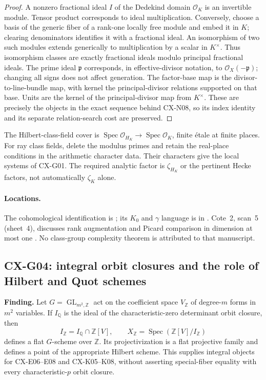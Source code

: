 \documentclass[11pt,a4paper]{article}
\begin{document}
\begin{proof}
A nonzero fractional ideal $I$ of the Dedekind domain $\mathcal O_K$ is an
invertible module.  Tensor product corresponds to ideal multiplication.
Conversely, choose a basis of the generic fiber of a rank-one locally free
module and embed it in $K$; clearing denominators identifies it with a
fractional ideal.  An isomorphism of two such modules extends generically
to multiplication by a scalar in $K^\times$.  Thus isomorphism classes
are exactly fractional ideals modulo principal fractional ideals.
The prime ideal $\mathfrak p$ corresponds, in effective-divisor notation,
to $\mathcal O_X(-\mathfrak p)$; changing all signs does not affect generation.
The factor-base map is the divisor-to-line-bundle map, with kernel the
principal-divisor relations supported on that base.  Units are the kernel
of the principal-divisor map from $K^\times$.  These are precisely the
objects in the exact sequence behind CX-N08, so its index identity and
its separate relation-search cost are preserved.
\end{proof}

The Hilbert-class-field cover is
$\operatorname{Spec}\mathcal O_{H_K}\to\operatorname{Spec}\mathcal O_K$,
finite étale at finite places.  For ray class fields, delete the modulus
primes and retain the real-place conditions in the arithmetic character data.
Their characters give the local systems of CX-G01.  The required analytic
factor is $\zeta_{H_K}$ or the pertinent Hecke factors, not automatically
$\zeta_K$ alone.

\paragraph{Locations.}
The cohomological identification is
\cite[Exp.~IX, Theorem~3.3]{SGA4}; its $K_0$ and $\gamma$ language is in
\cite[Exp.~V 3.10; Exp.~VI 3.2--3.3]{SGA6}.
Cote~2, scan~5 (sheet~4), discusses rank augmentation and Picard comparison
in dimension at most one \cite{Archive2}.  No class-group complexity
theorem is attributed to that manuscript.

\subsection{CX-G04: integral orbit closures and the role of Hilbert and Quot schemes}
\label{finding:CX-G04}

\textbf{Finding.} Let $G=\operatorname{GL}_{m^2,\mathbb Z}$ act on the
coefficient space $V_{\mathbb Z}$ of degree-$m$ forms in $m^2$ variables.
If $I_{\mathbb Q}$ is the ideal of the characteristic-zero determinant
orbit closure, then
\[
 I_{\mathbb Z}=I_{\mathbb Q}\cap\mathbb Z[V],\qquad
 X_{\mathbb Z}=\operatorname{Spec}(\mathbb Z[V]/I_{\mathbb Z})
\]
defines a flat $G$-scheme over $\mathbb Z$.  Its projectivization is a flat
projective family and defines a point of the appropriate Hilbert scheme.
This supplies integral objects for CX-E06--E08 and CX-K05--K08, without
asserting special-fiber equality with every characteristic-$p$ orbit closure.
\end{document}
